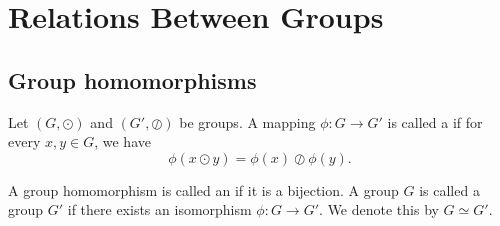 \chapter{Relations Between Groups}

\section{Group homomorphisms}

\begin{defn}
Let $ (G,\odot) $ and $ (G',\oslash) $ be groups. A mapping $ \phi:G\to G' $ is called a  if for every $ x,y\in G $, we have
\begin{equation*}
    \phi(x\odot y)=\phi(x)\oslash\phi(y).
\end{equation*}
\end{defn}

\begin{defn}
A group homomorphism is called an  if it is a bijection. A group $ G $ is called  a group $ G' $ if there exists an isomorphism $ \phi:G\to G' $. We denote this by $ G\simeq G' $.
\end{defn}

